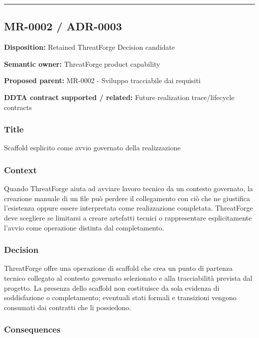 \documentclass[
  10pt,
  a4paper,
]{article}
\begin{document}
\begin{center}\rule{0.5\linewidth}{0.5pt}\end{center}

\subsection{MR-0002 / ADR-0003}\label{mr-0002-adr-0003}

\textbf{Disposition:} Retained ThreatForge Decision candidate

\textbf{Semantic owner:} ThreatForge product capability

\textbf{Proposed parent:} MR-0002 - Sviluppo tracciabile dai requisiti

\textbf{DDTA contract supported / related:} Future realization
trace/lifecycle contracts

\subsubsection{Title}\label{title-10}

Scaffold esplicito come avvio governato della realizzazione

\subsubsection{Context}\label{context-10}

Quando ThreatForge aiuta ad avviare lavoro tecnico da un contesto
governato, la creazione manuale di un file può perdere il collegamento
con ciò che ne giustifica l'esistenza oppure essere interpretata come
realizzazione completata. ThreatForge deve scegliere se limitarsi a
creare artefatti tecnici o rappresentare esplicitamente l'avvio come
operazione distinta dal completamento.

\subsubsection{Decision}\label{decision-10}

ThreatForge offre una operazione di scaffold che crea un punto di
partenza tecnico collegato al contesto governato selezionato e alla
tracciabilità prevista dal progetto. La presenza dello scaffold non
costituisce da sola evidenza di soddisfazione o completamento; eventuali
stati formali e transizioni vengono consumati dai contratti che li
possiedono.

\subsubsection{Consequences}\label{consequences-10}
\end{document}
